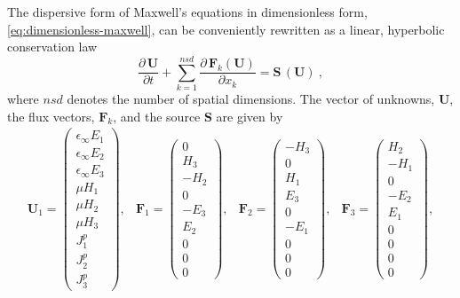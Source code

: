 The dispersive form of Maxwell's equations in dimensionless form, \ref{eq:dimensionless-maxwell}, can be conveniently rewritten as a linear, hyperbolic conservation law \cite{Godlewski:2013tj,LeVeque:2002vc}
\begin{equation}
\frac{\partial \, \mathbf{U}}{\partial t} + \sum_{k=1}^{nsd} \frac { \partial \, \mathbf{F}_k(\mathbf{U}) }{ \partial x_k } = \mathbf{S}\,(\mathbf{U}) \: ,
\label{maxwell-curl-equations-conservation-form}
\end{equation}
where $nsd$ denotes the number of spatial dimensions. The vector of unknowns, $\mathbf{U}$, the flux vectors, $\mathbf{F}_k$, and the source $\mathbf{S}$ are given by
\begin{equation*}
\begin{array}{ccccc}
\mathbf{U}_1 = \begin{pmatrix} \epsilon_{\infty} E_1 \\ \epsilon_{\infty} E_2 \\ \epsilon_{\infty} E_3 \\ \mu H_1 \\ \mu H_2 \\  \mu H_3 \\ J^p_1 \\  J^p_2 \\ J^p_3 \end{pmatrix} ,
&
\mathbf{F}_1 = \begin{pmatrix} 0 \\ H_3 \\ -H_2 \\ 0 \\ -E_3 \\ E_2 \\ 0 \\  0 \\ 0 \end{pmatrix} ,
&
\mathbf{F}_2 = \begin{pmatrix} - H_3 \\ 0 \\ H_1 \\ E_3 \\ 0 \\ -E_1 \\ 0 \\  0 \\ 0 \end{pmatrix} ,
&
\mathbf{F}_3 = \begin{pmatrix} H_2 \\ -H_1 \\ 0 \\ -E_2 \\ E_1 \\ 0 \\ 0 \\  0 \\ 0 \end{pmatrix} ,

\end{array}
\end{equation*}
